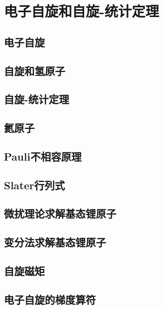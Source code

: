 \chapter{电子自旋和自旋-统计定理}
\section{电子自旋}

\section{自旋和氢原子}

\section{自旋-统计定理}

\section{氦原子}

\section{Pauli不相容原理}

\section{Slater行列式}

\section{微扰理论求解基态锂原子}

\section{变分法求解基态锂原子}

\section{自旋磁矩}

\section{电子自旋的梯度算符}